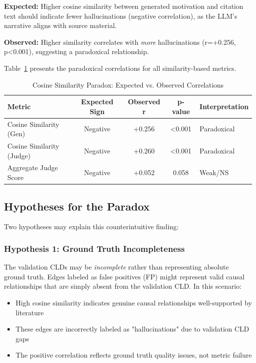 \textbf{Expected:} Higher cosine similarity between generated motivation and citation text should indicate fewer hallucinations (negative correlation), as the LLM's narrative aligns with source material.

\textbf{Observed:} Higher similarity correlates with \textit{more} hallucinations (r=+0.256, p<0.001), suggesting a paradoxical relationship.

Table~\ref{tab:cosine_paradox} presents the paradoxical correlations for all similarity-based metrics.

\begin{table}[h]
\centering
\caption{Cosine Similarity Paradox: Expected vs. Observed Correlations}
\label{tab:cosine_paradox}
\begin{tabular}{lcccl}
\toprule
\textbf{Metric} & \textbf{Expected Sign} & \textbf{Observed r} & \textbf{p-value} & \textbf{Interpretation} \\
\midrule
Cosine Similarity (Gen)   & Negative & +0.256 & <0.001 & Paradoxical \\
Cosine Similarity (Judge) & Negative & +0.260 & <0.001 & Paradoxical \\
Aggregate Judge Score     & Negative & +0.052 & 0.058  & Weak/NS \\
\bottomrule
\end{tabular}
\end{table}

\subsection{Hypotheses for the Paradox}

Two hypotheses may explain this counterintuitive finding:

\subsubsection{Hypothesis 1: Ground Truth Incompleteness}

The validation CLDs may be \textit{incomplete} rather than representing absolute ground truth. Edges labeled as false positives (FP) might represent valid causal relationships that are simply absent from the validation CLD. In this scenario:

\begin{itemize}
    \item High cosine similarity indicates genuine causal relationships well-supported by literature
    \item These edges are incorrectly labeled as "hallucinations" due to validation CLD gaps
    \item The positive correlation reflects ground truth quality issues, not metric failure
\end{itemize}

